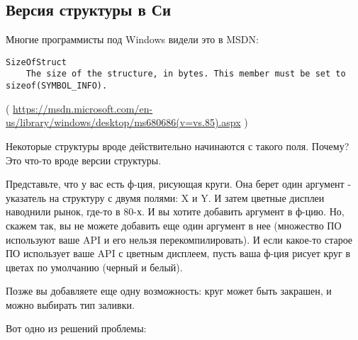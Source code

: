 \subsection{Версия структуры в Си}

Многие программисты под Windows видели это в MSDN:

\begin{lstlisting}
SizeOfStruct
    The size of the structure, in bytes. This member must be set to sizeof(SYMBOL_INFO).
\end{lstlisting}

( \url{https://msdn.microsoft.com/en-us/library/windows/desktop/ms680686(v=vs.85).aspx} )

Некоторые структуры вроде  действительно начинаются с такого поля. Почему?
Это что-то вроде версии структуры.

Представьте, что у вас есть ф-ция, рисующая круги.
Она берет один аргумент - указатель на структуру с двумя полями: X и Y.
И затем цветные дисплеи наводнили рынок, где-то в 80-х. И вы хотите добавить аргумент  в ф-цию.
Но, скажем так, вы не можете добавить еще один аргумент в нее (множество ПО используют ваше \ac{API} и его нельзя
перекомпилировать).
И если какое-то старое ПО использует ваше \ac{API} с цветным дисплеем,
пусть ваша ф-ция рисует круг в цветах по умолчанию (черный и белый).

Позже вы добавляете еще одну возможность: круг может быть закрашен, и можно выбирать тип заливки.

Вот одно из решений проблемы:

